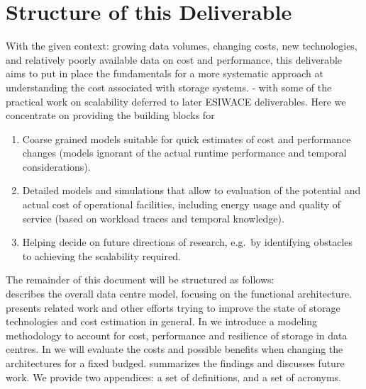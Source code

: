 \section{Structure of this Deliverable} 

With the given context: growing data volumes, changing costs, new technologies, and relatively poorly available data on cost and performance, this deliverable aims to put in place the fundamentals for a more systematic approach at understanding the cost associated with storage systems. - with some of the practical work on scalability deferred to later ESIWACE deliverables. Here we concentrate on providing the building blocks for
\begin{enumerate}
	\item Coarse grained models suitable for quick estimates of cost and performance changes (models  ignorant of the actual runtime performance and temporal considerations).
	\item Detailed models and simulations that allow to evaluation of the potential and actual cost of operational facilities, including energy usage and quality of service (based on workload traces and temporal knowledge).
	\item Helping decide on future directions of research, e.g.\ by identifying obstacles to achieving the scalability required.
\end{enumerate}


\noindent The remainder of this document will be structured as follows:\\
 describes the overall data centre model, focusing on the functional architecture.
 presents related work and other efforts trying to improve the state of storage technologies and cost estimation in general.
In  we introduce a modeling methodology to account for cost, performance and resilience of storage in data centres.
In  we will evaluate the costs and possible benefits when changing the architectures for a fixed budged.
 summarizes the findings and discusses future work.
We provide two appendices: a set of definitions, and a set of acronyms.
